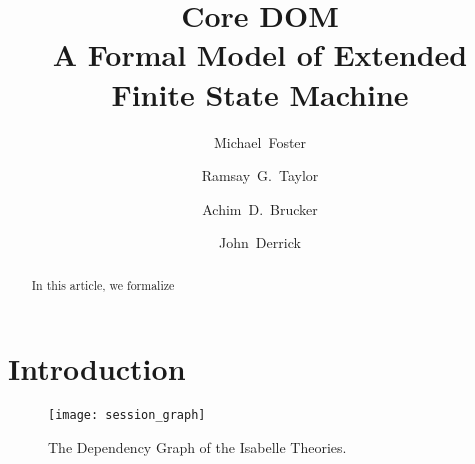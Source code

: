 \documentclass[10pt,DIV14,a4paper,twoside=semi,openright]
{scrartcl}
\title{Core DOM\\\medskip \Large 
  A Formal Model of Extended Finite State Machine}%
\author{Michael~Foster\orcidID{0000-0001-8233-9873} \and
 Ramsay~G.~Taylor\orcidID{0000-0002-4036-7590} \and
 Achim~D.~Brucker\orcidID{0000-0002-6355-1200} \and
 John~Derrick\orcidID{0000-0002-6631-8914}}
\begin{document}
\begin{titlepage}
  \maketitle
  \thispagestyle{empty}
  \begin{abstract}
    In this article, we formalize 


    \bigskip
  \end{abstract}
\end{titlepage}
\cleardoublepage

\tableofcontents
\cleardoublepage

\section{Introduction}
\cite{foster.ea:efsm:2018}
\begin{figure}
  \centering
  \texttt{[image: session\_graph]}
  \caption{The Dependency Graph of the Isabelle Theories.\label{fig:session-graph}}
\end{figure}

\clearpage



{\small
  
  
}
\end{document}
